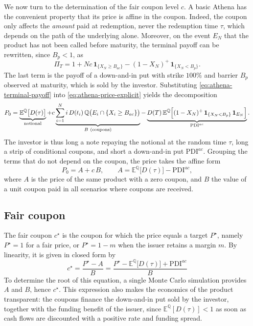 \documentclass[11pt,a4paper]{article}
\newcommand{\ind}{\mathbf{1}}
\begin{document}
We now turn to the determination of the fair coupon level $c$. A basic
Athena has the convenient property that its price is affine in the
coupon. Indeed, the coupon only affects the \emph{amount} paid at
redemption, never the redemption time $\tau$, which depends on the path
of the underlying alone. Moreover, on the event $E_N$ that the product has
not been called before maturity, the terminal payoff can be rewritten,
since $B_p < 1$, as
\begin{equation}
  \Pi_T = 1 + N c\, \ind_{\{X_N \geq B_{ac}\}}
        - (1 - X_N)^+ \, \ind_{\{X_N < B_p\}} .
  \label{eq:athena-terminal-payoff}
\end{equation}
The last term is the payoff of a down-and-in put with strike $100\%$ and
barrier $B_p$ observed at maturity, which is sold by the investor.
Substituting \eqref{eq:athena-terminal-payoff} into
\eqref{eq:athena-price-explicit} yields the decomposition
\begin{equation}
  P_0 = \underbrace{\mathbb{E}^{\mathbb{Q}}\bigl[ D(\tau) \bigr]}_{\text{notional}}
      + c \underbrace{\sum_{i=1}^{N} i\, D(t_i)\,
        \mathbb{Q}\bigl( E_i \cap \{X_i \geq B_{ac}\} \bigr)}_{B \ (\text{coupons})}
      - \underbrace{D(T)\, \mathbb{E}^{\mathbb{Q}}\Bigl[ (1 - X_N)^+ \,
        \ind_{\{X_N < B_p\}}\, \ind_{E_N} \Bigr]}_{\mathrm{PDI}^{ac}} .
  \label{eq:athena-pdi}
\end{equation}
The investor is thus long a note repaying the notional at the random time
$\tau$, long a strip of conditional coupons, and short a down-and-in put
$\mathrm{PDI}^{ac}$. Grouping the terms that do not depend on the coupon,
the price takes the affine form
\begin{equation}
  P_0 = A + c\, B,
  \qquad
  A = \mathbb{E}^{\mathbb{Q}}\bigl[ D(\tau) \bigr] - \mathrm{PDI}^{ac},
\end{equation}
where $A$ is the price of the same product with a zero coupon, and $B$
the value of a unit coupon paid in all scenarios where coupons are
received.

\subsection{Fair coupon}

The fair coupon $c^\star$ is the coupon for which the price equals a
target $P^\star$, namely $P^\star = 1$ for a fair price, or
$P^\star = 1 - m$ when the issuer retains a margin $m$. By linearity, it
is given in closed form by
\begin{equation}
  \boxed{\,c^\star = \frac{P^\star - A}{B}
  = \frac{P^\star - \mathbb{E}^{\mathbb{Q}}\bigl[ D(\tau) \bigr] + \mathrm{PDI}^{ac}}{B}\,}
  \label{eq:fair-coupon}
\end{equation}
To determine the root of this equation, a single Monte Carlo
simulation provides $A$ and $B$, hence $c^\star$. This expression also
makes the economics of the product transparent: the coupons finance the
down-and-in put sold by the investor, together with the funding benefit
of the issuer, since $\mathbb{E}^{\mathbb{Q}}[D(\tau)] < 1$ as soon as
cash flows are discounted with a positive rate and funding spread.
\end{document}
